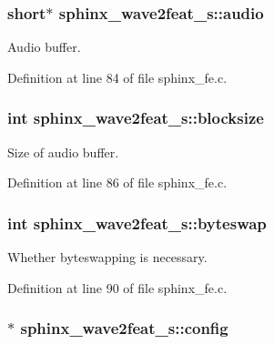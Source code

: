 \subsubsection[{audio}]{\setlength{\rightskip}{0pt plus 5cm}short$\ast$ {\bf sphinx\-\_\-wave2feat\-\_\-s\-::audio}}\label{structsphinx__wave2feat__s_a776c72734abe1e34162a5ee347f533e5}


\-Audio buffer. 



\-Definition at line 84 of file sphinx\-\_\-fe.\-c.

\subsubsection[{blocksize}]{\setlength{\rightskip}{0pt plus 5cm}int {\bf sphinx\-\_\-wave2feat\-\_\-s\-::blocksize}}\label{structsphinx__wave2feat__s_aff2646e41780ceb9dcd234c719fd25f1}


\-Size of audio buffer. 



\-Definition at line 86 of file sphinx\-\_\-fe.\-c.

\subsubsection[{byteswap}]{\setlength{\rightskip}{0pt plus 5cm}int {\bf sphinx\-\_\-wave2feat\-\_\-s\-::byteswap}}\label{structsphinx__wave2feat__s_a030717e2736fd04d1a281f51e5db2799}


\-Whether byteswapping is necessary. 



\-Definition at line 90 of file sphinx\-\_\-fe.\-c.

\subsubsection[{config}]{$\ast$ {\bf sphinx\-\_\-wave2feat\-\_\-s\-::config}}\label{structsphinx__wave2feat__s_a484d308befbde315664da8520ebc410d}


